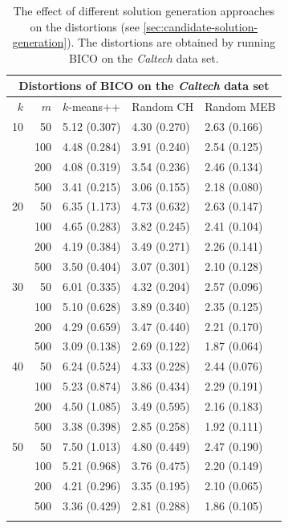 \begin{longtable}{rrlll}
\multicolumn{5}{c}{\textbf{Distortions of BICO on the \textit{Caltech} data set}} \\
\toprule
 $k$ &   $m$ &    $k$-means++ &    Random CH &   Random MEB \\
\midrule
10  &  50 & 5.12 (0.307) & 4.30 (0.270) & 2.63 (0.166) \\
    & 100 & 4.48 (0.284) & 3.91 (0.240) & 2.54 (0.125) \\
    & 200 & 4.08 (0.319) & 3.54 (0.236) & 2.46 (0.134) \\
    & 500 & 3.41 (0.215) & 3.06 (0.155) & 2.18 (0.080) \\
\midrule
20  &  50 & 6.35 (1.173) & 4.73 (0.632) & 2.63 (0.147) \\
    & 100 & 4.65 (0.283) & 3.82 (0.245) & 2.41 (0.104) \\
    & 200 & 4.19 (0.384) & 3.49 (0.271) & 2.26 (0.141) \\
    & 500 & 3.50 (0.404) & 3.07 (0.301) & 2.10 (0.128) \\
\midrule
30  &  50 & 6.01 (0.335) & 4.32 (0.204) & 2.57 (0.096) \\
    & 100 & 5.10 (0.628) & 3.89 (0.340) & 2.35 (0.125) \\
    & 200 & 4.29 (0.659) & 3.47 (0.440) & 2.21 (0.170) \\
    & 500 & 3.09 (0.138) & 2.69 (0.122) & 1.87 (0.064) \\
\midrule
40  &  50 & 6.24 (0.524) & 4.33 (0.228) & 2.44 (0.076) \\
    & 100 & 5.23 (0.874) & 3.86 (0.434) & 2.29 (0.191) \\
    & 200 & 4.50 (1.085) & 3.49 (0.595) & 2.16 (0.183) \\
    & 500 & 3.38 (0.398) & 2.85 (0.258) & 1.92 (0.111) \\
\midrule
50  &  50 & 7.50 (1.013) & 4.80 (0.449) & 2.47 (0.190) \\
    & 100 & 5.21 (0.968) & 3.76 (0.475) & 2.20 (0.149) \\
    & 200 & 4.21 (0.296) & 3.35 (0.195) & 2.10 (0.065) \\
    & 500 & 3.36 (0.429) & 2.81 (0.288) & 1.86 (0.105) \\
\bottomrule
\caption{The effect of different solution generation approaches on the distortions (see \cref{sec:candidate-solution-generation}).
The distortions are obtained by running BICO on the \textit{Caltech} data set.
}
\label{tab:comparison-solution-generation-caltech-bico}
\end{longtable}

















